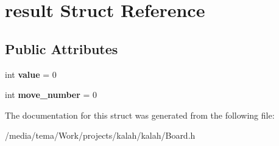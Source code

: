 \hypertarget{structresult}{}\section{result Struct Reference}
\label{structresult}
\subsection*{Public Attributes}
\begin{DoxyCompactItemize}
\item 
int {\bfseries value} = 0\hypertarget{structresult_ac4e041a0e64f574fd5be4a62ed02c932}{}\label{structresult_ac4e041a0e64f574fd5be4a62ed02c932}

\item 
int {\bfseries move\+\_\+number} = 0\hypertarget{structresult_acca8b67e89d2c7c7baf0ce8710676a45}{}\label{structresult_acca8b67e89d2c7c7baf0ce8710676a45}

\end{DoxyCompactItemize}


The documentation for this struct was generated from the following file\+:\begin{DoxyCompactItemize}
\item 
/media/tema/\+Work/projects/kalah/kalah/Board.\+h\end{DoxyCompactItemize}
